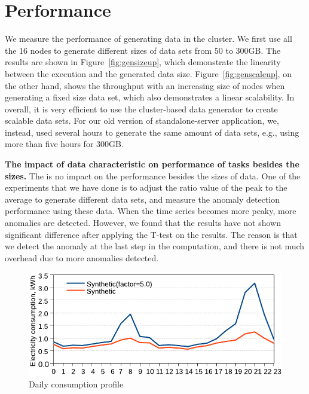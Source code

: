 \documentclass[a4paper,12pt]{llncs}
\begin{document}
\section{Performance}
We measure the performance of generating data in the cluster. We first use all the 16 nodes to generate different sizes of data sets from 50 to 300GB. The results are shown in Figure~\ref{fig:gensizeup}, which demonstrate the linearity between the execution and the generated data size. Figure~\ref{fig:genscaleup}, on the other hand, shows the throughput with an increasing size of nodes when generating a fixed size data set, which also demonstrates a linear scalability. In overall, it is very efficient to use the cluster-based data generator to create scalable data sets. For our old version of standalone-server application, we, instead, used several hours to generate the same amount of data sets, e.g., using more than five hours for 300GB.


{\bf The impact of data characteristic on performance of tasks besides the sizes.} The is no impact on the performance besides the sizes of data. One of the experiments that we have done is to adjust the ratio value of the peak to the average to generate different data sets, and measure the anomaly detection performance using these data. When the time series becomes more peaky, more anomalies are detected. However, we found that the results have not shown significant difference after applying the T-test on the results. The reason is that we detect the anomaly at the last step in the computation, and there is not much overhead due to more anomalies detected.

\begin{figure}[t]
\centering
\includegraphics[scale=0.8]{images/onedayconsumptiondata}
\caption{Daily consumption profile}
\label{fig:onedayconsumptiondata} 
\end{figure}
\end{document}

